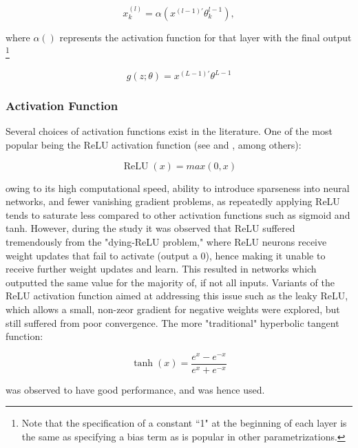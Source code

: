 \documentclass[a4paper, table]{article}
\newcommand{\smalltodo}[2][] {\todo[caption={#2}, size=\scriptsize,%
	fancyline,#1]{\begin{spacing}{.5}#2\end{spacing}}}
\newcommand{\rhs}[2][]{\smalltodo[color=green!30,#1]{{\bf RS:} #2}}
\begin{document}
\begin{equation}
x_k^{(l)} = \alpha(x^{(l-1)'}\theta_k^{l-1}),
\end{equation}

where $\alpha()$ represents the activation function for that layer with the final output \footnote{Note that the specification of a constant ``1" at the beginning of each layer is the same as specifying a bias term as is popular in other parametrizations. }

\begin{equation}
g(z;\theta) = x^{(L-1)'}\theta^{L-1}
\end{equation}

\rhs{move this paragraph elsewhere}

\subsubsection{Activation Function}

Several choices of activation functions exist in the literature. One of the most popular being the ReLU activation function (see \cite{lecun_deep_2015} and \cite{ramachandran_searching_2017}, among others):

\begin{equation}
\operatorname{ReLU}(x) = max(0, x)
\end{equation}

owing to its high computational speed, ability to introduce sparseness into neural networks, and fewer vanishing gradient problems, as repeatedly applying ReLU tends to saturate less compared to other activation functions such as sigmoid and tanh. However, during the study it was observed that ReLU suffered tremendously from the "dying-ReLU problem," where ReLU neurons receive weight updates that fail to activate (output a 0), hence making it unable to receive further weight updates and learn. This resulted in networks which outputted the same value for the majority of, if not all inputs. Variants of the ReLU activation function aimed at addressing this issue such as the leaky ReLU, which allows a small, non-zeor gradient for negative weights were explored, but still suffered from poor convergence. The more "traditional" hyperbolic tangent function:

\begin{equation}
\operatorname{tanh}(x) = \frac{e^x - e^{-x}}{e^x + e^{-x}}
\end{equation}

was observed to have good performance, and was hence used.
\end{document}
